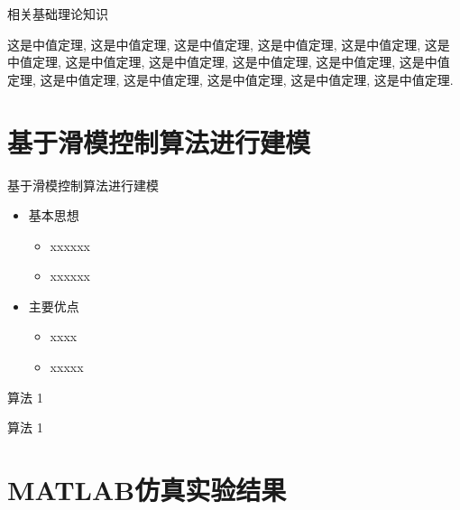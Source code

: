 \documentclass[10pt,compress,t,fontset=none]{ctexbeamer}
\begin{document}
\begin{frame}{ 相关基础理论知识}
  \begin{theorem}[中值定理]
    这是中值定理, 这是中值定理, 这是中值定理, 这是中值定理,
    这是中值定理, 这是中值定理, 这是中值定理, 这是中值定理,
    这是中值定理, 这是中值定理, 这是中值定理, 这是中值定理,
    这是中值定理, 这是中值定理, 这是中值定理, 这是中值定理.
  \end{theorem}
\end{frame}

\section{基于滑模控制算法进行建模}
\begin{frame}{基于滑模控制算法进行建模}
\begin{itemize}
  \item 基本思想
  \begin{itemize}
    \item xxxxxx
    \item xxxxxx
  \end{itemize}
  \bigskip

  \item 主要优点
  \begin{itemize}
    \item  xxxx
    \item  xxxxx
  \end{itemize}
\end{itemize}
\end{frame}


\begin{frame}{算法 1}

  算法 1

\end{frame}


\section{MATLAB仿真实验结果}
\end{document}
